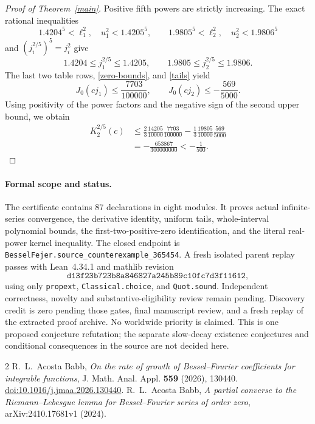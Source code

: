 \documentclass[11pt]{article}
\newcommand{\J}{J_0}
\begin{document}
\begin{proof}[Proof of Theorem~\ref{main}]
Positive fifth powers are strictly increasing. The exact rational inequalities
\[
 1.4204^5<\ell_1^2,\quad u_1^2<1.4205^5,\qquad
 1.9805^5<\ell_2^2,\quad u_2^2<1.9806^5
\]
and $(j_i^{2/5})^5=j_i^2$ give
\[
 1.4204\leq j_1^{2/5}\leq1.4205,\qquad
 1.9805\leq j_2^{2/5}\leq1.9806.
\]
The last two table rows, \eqref{zero-bounds}, and \eqref{tails} yield
\[
 \J(cj_1)\leq\frac{7703}{100000},\qquad
 \J(cj_2)\leq-\frac{569}{5000}.
\]
Using positivity of the power factors and the negative sign of the second
upper bound, we obtain
\begin{align*}
 K_2^{2/5}(c)
 &\leq\frac23\frac{14205}{10000}\frac{7703}{100000}
       -\frac13\frac{19805}{10000}\frac{569}{5000}\\
 &=-\frac{653867}{300000000}<-\frac1{500}.
\end{align*}
\end{proof}

\paragraph{Formal scope and status.}
The certificate contains 87 declarations in eight modules. It proves actual
infinite-series convergence, the derivative identity, uniform tails,
whole-interval polynomial bounds, the first-two-positive-zero identification,
and the literal real-power kernel inequality. The closed endpoint is
\texttt{BesselFejer.source\_counterexample\_365454}.
A fresh isolated parent replay passes with Lean~4.34.1 and mathlib revision
\[\texttt{d13f23b723b8a846827a245b89c10fc7d3f11612},\]
using only \texttt{propext}, \texttt{Classical.choice}, and \texttt{Quot.sound}.
Independent correctness, novelty and substantive-eligibility review remain
pending. Discovery credit is zero pending those gates, final manuscript review,
and a fresh replay of the extracted proof archive. No worldwide priority is claimed.
This is one proposed conjecture refutation; the separate slow-decay existence
conjectures and conditional consequences in the source are not decided here.

\begin{thebibliography}{2}
 R.~L.~Acosta Babb,
\emph{On the rate of growth of Bessel--Fourier coefficients for integrable functions},
J. Math. Anal. Appl. \textbf{559} (2026), 130440.
\href{https://doi.org/10.1016/j.jmaa.2026.130440}{doi:10.1016/j.jmaa.2026.130440}.
 R.~L.~Acosta Babb,
\emph{A partial converse to the Riemann--Lebesgue lemma for Bessel--Fourier
series of order zero}, arXiv:2410.17681v1 (2024).
\end{thebibliography}
\end{document}
